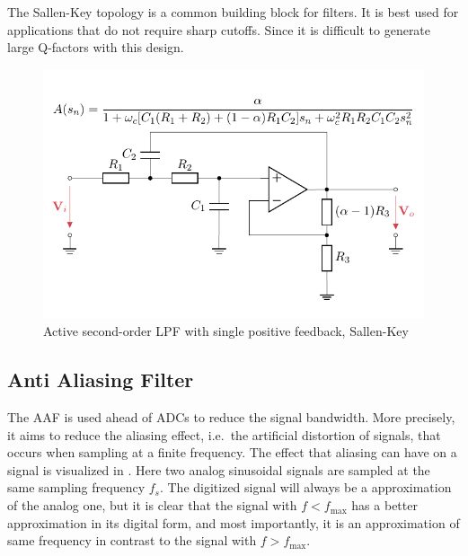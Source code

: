 The Sallen-Key topology is a common building block for filters. It is best used for applications that do not require sharp cutoffs. Since it is difficult to generate large Q-factors with this design.
\begin{figure}[!htb]
  \centering
  \includegraphics[scale=0.95]{figures/electronics/lowpass/lp_active_2ord_pos/lp_active_2ord_pos}
  \caption[Active Second-Order \ac{LPF} With Single Positive Feedback]{Active second-order \ac{LPF} with single positive feedback, Sallen-Key%
    \label{fig:lp_active_2ord_pos}}
\end{figure}

%

\newpage
\subsection{Anti Aliasing Filter}
The \acf{AAF} is used ahead of \ac{ADC}s to reduce the signal bandwidth. More precisely, it aims to reduce the aliasing effect, i.e.\ the artificial distortion of signals, that occurs when sampling at a finite frequency. The effect that aliasing can have on a signal is visualized in . Here two analog sinusoidal signals are sampled at the same sampling frequency $f_s$. The digitized signal will always be a approximation of the analog one, but it is clear that the signal with $f<f_{\max}$ has a better approximation in its digital form, and most importantly, it is an approximation of same frequency in contrast to the signal with $f>f_{\max}$.

